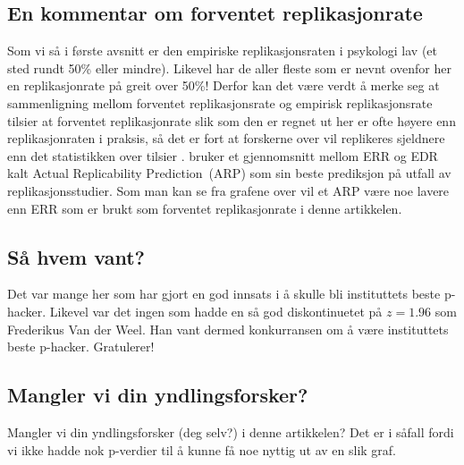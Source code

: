 \documentclass[doc,norsk]{apa7}
\begin{document}
\subsection{En kommentar om forventet replikasjonrate}
Som vi så i første avsnitt er den empiriske replikasjonsraten i psykologi lav (et sted rundt 50\% eller mindre). Likevel har de aller fleste som er nevnt ovenfor her en replikasjonrate på greit over 50\%! Derfor kan det være verdt å merke seg at sammenligning mellom forventet replikasjonsrate og empirisk replikasjonsrate tilsier at forventet replikasjonrate slik som den er regnet ut her er ofte høyere enn replikasjonraten i praksis, så det er fort at forskerne over vil replikeres sjeldnere enn det statistikken over tilsier \parencite{z-curve-implementasjon, z-curve-mot-empiri}. \textcite{arp} bruker et gjennomsnitt mellom ERR og EDR kalt \guillemetleft Actual Replicability Prediction\guillemetright\ (ARP) som sin beste prediksjon på utfall av replikasjonsstudier. Som man kan se fra grafene over vil et ARP være noe lavere enn ERR som er brukt som forventet replikasjonrate i denne artikkelen.

\subsection{Så hvem vant?}
Det var mange her som har gjort en god innsats i å skulle bli instituttets beste p-hacker. Likevel var det ingen som hadde en så god diskontinuetet på $z=1.96$ som Frederikus Van der Weel. Han vant dermed konkurransen om å være instituttets beste p-hacker. Gratulerer!

\subsection{Mangler vi din yndlingsforsker?}

Mangler vi din yndlingsforsker (deg selv?) i denne artikkelen? Det er i såfall fordi vi ikke hadde nok p-verdier til å kunne få noe nyttig ut av en slik graf.

\end{document}
